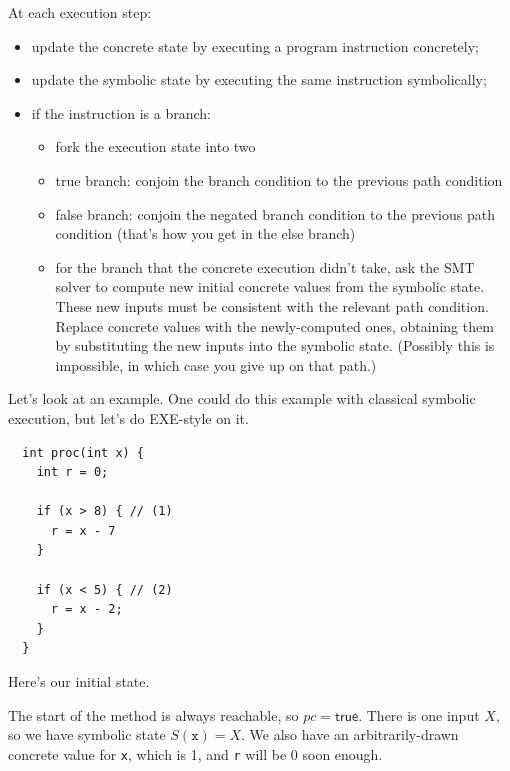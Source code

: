 \documentclass[11pt]{article}
\begin{document}
At each execution step:
\begin{itemize}[noitemsep]
\item update the concrete state by executing a program instruction concretely;
\item update the symbolic state by executing the same instruction symbolically;
\item if the instruction is a branch:
  \begin{itemize}
    \item fork the execution state into two
    \item true branch: conjoin the branch condition to the previous path condition
    \item false branch: conjoin the negated branch condition to the previous path condition (that's how you get in the else branch)
    \item for the branch that the concrete execution didn't take, ask the SMT solver to compute new initial concrete values from the symbolic state. These new inputs must be consistent with the relevant path condition. Replace concrete values with the newly-computed ones, obtaining them by substituting the new inputs into the symbolic state. (Possibly this is impossible, in which case you give up on that path.)
  \end{itemize}
\end{itemize}
Let's look at an example. One could do this example with classical symbolic execution, but let's do EXE-style on it.
\begin{lstlisting}
  int proc(int x) {
    int r = 0;

    if (x > 8) { // (1)
      r = x - 7
    }

    if (x < 5) { // (2)
      r = x - 2;
    }
  }
\end{lstlisting}

Here's our initial state.


\begin{center}
\end{center}
The start of the method is always reachable, so \textbf{$pc = \textsf{true}$}. There is one input $X$,
so we have symbolic state $S(\mathtt{x}) = X$. We also have an arbitrarily-drawn concrete value for
\texttt{x}, which is 1, and \texttt{r} will be 0 soon enough.
\end{document}
